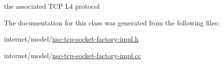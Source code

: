 the associated T\+CP L4 protocol 



The documentation for this class was generated from the following files\+:\begin{DoxyCompactItemize}
\item 
internet/model/\hyperlink{nsc-tcp-socket-factory-impl_8h}{nsc-\/tcp-\/socket-\/factory-\/impl.\+h}\item 
internet/model/\hyperlink{nsc-tcp-socket-factory-impl_8cc}{nsc-\/tcp-\/socket-\/factory-\/impl.\+cc}\end{DoxyCompactItemize}
